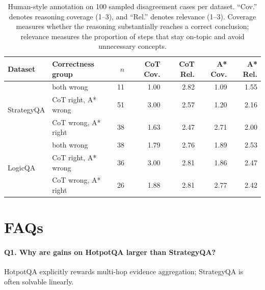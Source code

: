 \documentclass[11pt]{article}
\begin{document}
{\begin{table}[t]
\centering
\small
\begin{tabular}{llrrrrr}
\toprule
Dataset & Correctness group & $n$ & CoT Cov. & CoT Rel. & A* Cov. & A* Rel. \\
\midrule
\multirow{3}{*}{StrategyQA}
& both wrong            & 11 & 1.00 & 2.82 & 1.09 & 1.55 \\
& CoT right, A* wrong   & 51 & 3.00 & 2.57 & 1.20 & 2.16 \\
& CoT wrong, A* right   & 38 & 1.63 & 2.47 & 2.71 & 2.00 \\
\midrule
\multirow{3}{*}{LogicQA}
& both wrong            & 38 & 1.79 & 2.76 & 1.89 & 2.53 \\
& CoT right, A* wrong   & 36 & 3.00 & 2.81 & 1.86 & 2.47 \\
& CoT wrong, A* right   & 26 & 1.88 & 2.81 & 2.77 & 2.42 \\
\bottomrule
\end{tabular}
\caption{Human-style annotation on 100 sampled disagreement cases per dataset. “Cov.” denotes reasoning coverage (1--3), and “Rel.” denotes relevance (1--3). Coverage measures whether the reasoning substantially reaches a correct conclusion; relevance measures the proportion of steps that stay on-topic and avoid unnecessary concepts.}
\label{tab:disagreement-human-eval}
\end{table}








\section{FAQs}
\label{app:faqs}

\paragraph{Q1. Why are gains on HotpotQA larger than StrategyQA?}
HotpotQA explicitly rewards multi-hop evidence aggregation; StrategyQA is often solvable linearly.

}
\end{document}
